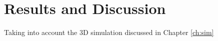 \chapter{Results and Discussion}\label{ch:results}
Taking into account the 3D simulation discussed in Chapter \ref{ch:sim} 